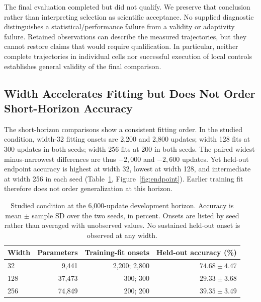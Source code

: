 \documentclass{article}
\begin{document}
The final evaluation completed but did not qualify. We preserve that conclusion rather than interpreting selection as scientific acceptance. No supplied diagnostic distinguishes a statistical/performance failure from a validity or adaptivity failure. Retained observations can describe the measured trajectories, but they cannot restore claims that would require qualification. In particular, neither complete trajectories in individual cells nor successful execution of local controls establishes general validity of the final comparison.

\subsection{Width Accelerates Fitting but Does Not Order Short-Horizon Accuracy}
The short-horizon comparisons show a consistent fitting order. In the studied condition, width-32 fitting onsets are 2,200 and 2,800 updates; width 128 fits at 300 updates in both seeds; width 256 fits at 200 in both seeds. The paired widest-minus-narrowest differences are thus $-2,000$ and $-2,600$ updates. Yet held-out endpoint accuracy is highest at width 32, lowest at width 128, and intermediate at width 256 in each seed (Table~\ref{tab:development}, Figure~\ref{fig:endpoint}). Earlier training fit therefore does not order generalization at this horizon.

\begin{table}[t]
\centering
\caption{Studied condition at the 6,000-update development horizon. Accuracy is mean $\pm$ sample SD over the two seeds, in percent. Onsets are listed by seed rather than averaged with unobserved values. No sustained held-out onset is observed at any width.}
\label{tab:development}
\begin{tabular}{lrrr}
\toprule
Width & Parameters & Training-fit onsets & Held-out accuracy (\%) \\
\midrule
32 & 9,441 & 2,200; 2,800 & $74.68\pm4.47$ \\
128 & 37,473 & 300; 300 & $29.33\pm3.68$ \\
256 & 74,849 & 200; 200 & $39.35\pm3.49$ \\
\bottomrule
\end{tabular}
\end{table}
\end{document}
